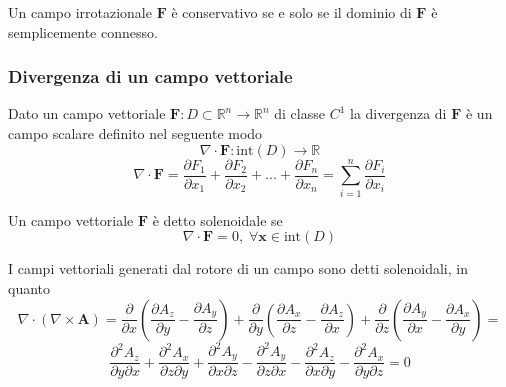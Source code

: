 \documentclass{article}
\begin{document}
                \vspace{10pt}
                Un campo irrotazionale $\mathbf{F}$ è conservativo se e solo se il dominio di $\mathbf{F}$ è semplicemente connesso.

            \vspace{10pt}
            \subsubsection{Divergenza di un campo vettoriale}
                Dato un campo vettoriale $\mathbf{F}: D \subset \mathbb{R}^{n} \rightarrow \mathbb{R}^{n}$ di classe $C^{1}$ la divergenza di $\mathbf{F}$ è un campo scalare definito nel seguente modo
                \[
                    \nabla \cdot \mathbf{F}: \text{int}(D) \rightarrow \mathbb{R}
                \]
                \[
                    \nabla \cdot \mathbf{F} = \frac{\partial F_{1}}{\partial x_{1}} + \frac{\partial F_{2}}{\partial x_{2}} + ... + \frac{\partial F_{n}}{\partial x_{n}} = \sum_{i = 1}^{n} \frac{\partial F_{i}}{\partial x_{i}}
                \]

                Un campo vettoriale $\mathbf{F}$ è detto solenoidale se 
                \[
                    \nabla \cdot \mathbf{F} = 0, \; \forall \mathbf{x} \in \text{int}(D)
                \]

                I campi vettoriali generati dal rotore di un campo sono detti solenoidali, in quanto
                \[
                    \nabla \cdot (\nabla \times \mathbf{A}) = \frac{\partial }{\partial x} \left( \frac{\partial A_{z}}{\partial y} - \frac{\partial A_{y}}{\partial z} \right) + \frac{\partial}{\partial y} \left( \frac{\partial A_{x}}{\partial z} - \frac{\partial A_{z}}{\partial x} \right) + \frac{\partial}{\partial z} \left( \frac{\partial A_{y}}{\partial x} - \frac{\partial A_{x}}{\partial y} \right) =
                \]
                \[
                    \frac{\partial^{2} A_{z}}{\partial y \partial x} + \frac{\partial^{2} A_{x}}{\partial z \partial y} + \frac{\partial^{2} A_{y}}{\partial x \partial z} - \frac{\partial^{2} A_{y}}{\partial z \partial x} - \frac{\partial^{2} A_{z}}{\partial x \partial y} - \frac{\partial^{2} A_{x}}{\partial y \partial z} = 0
                \]

            
            \vspace{10pt}
\end{document}

